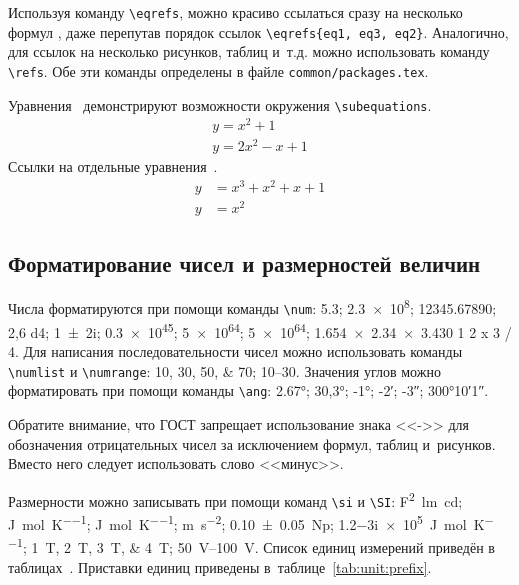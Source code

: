 Используя команду \verb|\eqrefs|, можно
красиво ссылаться сразу на несколько формул
, даже перепутав
порядок ссылок \verb|\eqrefs{eq1, eq3, eq2}|.
Аналогично, для ссылок на несколько рисунков, таблиц и~т.\:д.
 можно использовать
команду \verb|\refs|.
Обе эти команды определены в файле \verb|common/packages.tex|.

Уравнения~ демонстрируют возможности
окружения \verb|\subequations|.
\begin{subequations}
    \label{eq:subeq_1}
    \begin{gather}
        y = x^2 + 1 \label{eq:subeq_1-1} \\
        y = 2 x^2 - x + 1 \label{eq:subeq_1-2}
    \end{gather}
\end{subequations}
Ссылки на отдельные уравнения~.
\begin{subequations}
    \label{eq:subeq_2}
    \begin{align}
        y &= x^3 + x^2 + x + 1 \label{eq:subeq_2-1} \\
        y &= x^2
    \end{align}
\end{subequations}

\subsection{Форматирование чисел и размерностей величин}\label{sec:units}

Числа форматируются при помощи команды \verb|\num|:
\num{5,3};
\num{2,3e8};
\num{12345,67890};
\num{2,6 d4};
\num{1+-2i};
\num{.3e45};
\num[exponent-base=2]{5 e64};
\num[exponent-base=2,exponent-to-prefix]{5 e64};
\num{1.654 x 2.34 x 3.430}
\num{1 2 x 3 / 4}.
Для написания последовательности чисел можно использовать команды \verb|\numlist| и \verb|\numrange|:
\numlist{10;30;50;70}; \numrange{10}{30}.
Значения углов можно форматировать при помощи команды \verb|\ang|:
\ang{2.67};
\ang{30,3};
\ang{-1;;};
\ang{;-2;};
\ang{;;-3};
\ang{300;10;1}.

Обратите внимание, что ГОСТ запрещает использование знака <<->> для обозначения отрицательных чисел
за исключением формул, таблиц и~рисунков.
Вместо него следует использовать слово <<минус>>.

Размерности можно записывать при помощи команд \verb|\si| и \verb|\SI|:
\si{\farad\squared\lumen\candela};
\si{\joule\per\mole\per\kelvin};
\si[per-mode = symbol-or-fraction]{\joule\per\mole\per\kelvin};
\si{\metre\per\second\squared};
\SI{0.10(5)}{\neper};
\SI{1.2-3i e5}{\joule\per\mole\per\kelvin};
\SIlist{1;2;3;4}{\tesla};
\SIrange{50}{100}{\volt}.
Список единиц измерений приведён в таблицах~.
Приставки единиц приведены в~таблице~\ref{tab:unit:prefix}.

